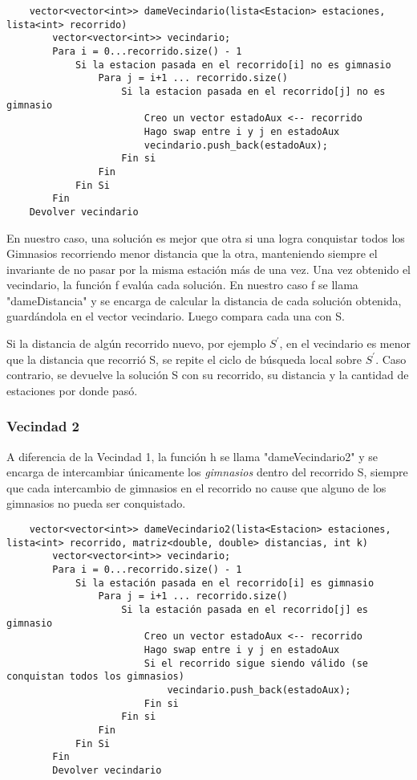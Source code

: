     \begin{codesnippet}
	\begin{verbatim}
    vector<vector<int>> dameVecindario(lista<Estacion> estaciones, lista<int> recorrido)
        vector<vector<int>> vecindario;
        Para i = 0...recorrido.size() - 1
            Si la estacion pasada en el recorrido[i] no es gimnasio
                Para j = i+1 ... recorrido.size()
                    Si la estacion pasada en el recorrido[j] no es gimnasio
                        Creo un vector estadoAux <-- recorrido
                        Hago swap entre i y j en estadoAux
                        vecindario.push_back(estadoAux);
                    Fin si
                Fin
            Fin Si
        Fin
    Devolver vecindario
    \end{verbatim}
    \end{codesnippet}

    En nuestro caso, una solución es mejor que otra si una logra conquistar todos los Gimnasios recorriendo menor distancia que la otra, manteniendo siempre el invariante de no pasar por la misma estación más de una vez. 
	Una vez obtenido el vecindario, la función f evalúa cada solución. En nuestro caso f se llama "dameDistancia" y se encarga de calcular la distancia de cada solución obtenida, guardándola en el vector vecindario. Luego compara cada una con S. 
	\par Si la distancia de algún recorrido nuevo, por ejemplo $S^{'}$, en el vecindario es menor que la distancia que recorrió S, se repite el ciclo de búsqueda local sobre $S^{'}$. Caso contrario, se devuelve la solución S con su recorrido, su distancia y la cantidad de estaciones por donde pasó.

   \subsubsection{Vecindad 2}

    \par A diferencia de la Vecindad 1, la función h se llama "dameVecindario2" y se encarga de intercambiar únicamente los \emph{gimnasios} dentro del recorrido S, siempre que cada intercambio de gimnasios en el recorrido no cause que alguno de los gimnasios no pueda ser conquistado.

    \begin{codesnippet}
	\begin{verbatim}
	vector<vector<int>> dameVecindario2(lista<Estacion> estaciones, lista<int> recorrido, matriz<double, double> distancias, int k)
		vector<vector<int>> vecindario;
		Para i = 0...recorrido.size() - 1
			Si la estación pasada en el recorrido[i] es gimnasio
				Para j = i+1 ... recorrido.size()
					Si la estación pasada en el recorrido[j] es gimnasio
						Creo un vector estadoAux <-- recorrido
						Hago swap entre i y j en estadoAux
						Si el recorrido sigue siendo válido (se conquistan todos los gimnasios)
							vecindario.push_back(estadoAux);
						Fin si
					Fin si
				Fin
			Fin Si
		Fin
		Devolver vecindario
    \end{verbatim}
    \end{codesnippet}
	

